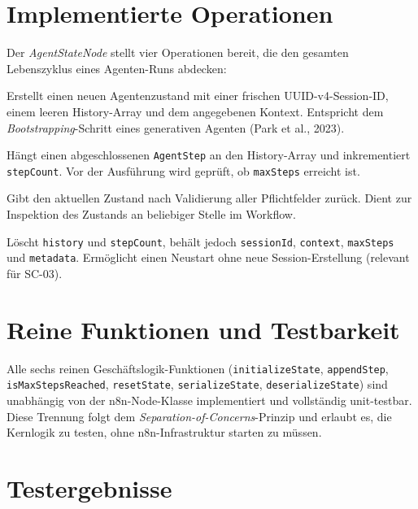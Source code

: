 \documentclass[12pt,a4paper,oneside]{report}
\begin{document}
\section{Implementierte Operationen}

Der \textit{AgentStateNode} stellt vier Operationen bereit, die den gesamten
Lebenszyklus eines Agenten-Runs abdecken:

\begin{description}[leftmargin=3cm]
  \item[\texttt{initialize}] Erstellt einen neuen Agentenzustand mit einer
    frischen UUID-v4-Session-ID, einem leeren History-Array und dem angegebenen
    Kontext. Entspricht dem \textit{Bootstrapping}-Schritt eines generativen Agenten
    (Park et al., 2023).

  \item[\texttt{update}] Hängt einen abgeschlossenen \texttt{AgentStep} an den
    History-Array und inkrementiert \texttt{stepCount}. Vor der Ausführung wird
    geprüft, ob \texttt{maxSteps} erreicht ist.

  \item[\texttt{get}] Gibt den aktuellen Zustand nach Validierung aller Pflichtfelder
    zurück. Dient zur Inspektion des Zustands an beliebiger Stelle im Workflow.

  \item[\texttt{reset}] Löscht \texttt{history} und \texttt{stepCount}, behält jedoch
    \texttt{sessionId}, \texttt{context}, \texttt{maxSteps} und \texttt{metadata}.
    Ermöglicht einen Neustart ohne neue Session-Erstellung (relevant für SC-03).
\end{description}

\section{Reine Funktionen und Testbarkeit}

Alle sechs reinen Geschäftslogik-Funktionen (\texttt{initializeState},
\texttt{appendStep}, \texttt{isMaxStepsReached}, \texttt{resetState},
\texttt{serializeState}, \texttt{deserializeState}) sind unabhängig von der n8n-Node-Klasse
implementiert und vollständig unit-testbar. Diese Trennung folgt dem
\textit{Separation-of-Concerns}-Prinzip und erlaubt es, die Kernlogik zu testen,
ohne n8n-Infrastruktur starten zu müssen.

\section{Testergebnisse}
\end{document}
